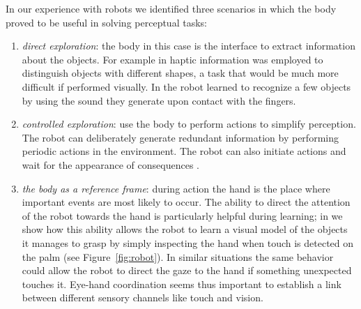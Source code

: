 In our experience with robots we identified three scenarios in which
the body proved to be useful in solving perceptual tasks:

\begin{enumerate}

\item {\em direct exploration}: the body in this case is the interface to
   extract information about the objects. For example in
   \cite{natale04learning} haptic information was employed to
   distinguish objects with different shapes, a task that would be much
   more difficult if performed visually. In
   \cite{torres-jara05tapping} the robot learned to recognize a few
   objects by using the sound they generate upon contact with the
   fingers.

\item {\em controlled exploration}: use the body to perform actions to simplify
   perception. The robot can deliberately generate redundant
   information by performing periodic actions in the environment. The robot
   can also initiate actions and wait for the appearance of consequences 
   \cite{fitzpatrick03grounding}.

\item {\em the body as a reference frame}: during action the hand is the place
   where important events are most likely to occur. The ability to
   direct the attention of the robot towards the hand is particularly
   helpful during learning; in \cite{natale05exploring} we show how
   this ability allows the robot to learn a visual model of the
   objects it manages to grasp by simply inspecting the hand when
   touch is detected on the palm (see Figure~\ref{fig:robot}). In
   similar situations the same behavior could allow the robot to
   direct the gaze to the hand if something unexpected touches
   it. Eye-hand coordination seems thus important to establish a link
   between different sensory channels like touch and vision.

\end{enumerate}

%


